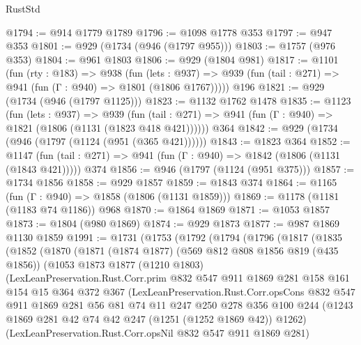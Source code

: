 \begin{lexlean}{RustStd}
\begin{coremodule}
@1794 := @914 @1779 @1789
@1796 := @1098 @1778 @353
@1797 := @947 @353
@1801 := @929 (@1734 (@946 (@1797 @955)))
@1803 := @1757 (@976 @353)
@1804 := @961 @1803
@1806 := @929 (@1804 @981)
@1817 := @1101
    (fun (rty : @183) =>
    @938
      (fun (lets : @937) =>
      @939 (fun (tail : @271) => @941 (fun (Γ : @940) => @1801 (@1806 @1767)))))
    @196
@1821 := @929 (@1734 (@946 (@1797 @1125)))
@1823 := @1132 @1762 @1478
@1835 := @1123
    (fun (lets : @937) =>
    @939 (fun (tail : @271) => @941 (fun (Γ : @940) => @1821 (@1806 (@1131 (@1823 @418 @421))))))
    @364
@1842 := @929 (@1734 (@946 (@1797 (@1124 (@951 (@365 @421))))))
@1843 := @1823 @364
@1852 := @1147
    (fun (tail : @271) => @941 (fun (Γ : @940) => @1842 (@1806 (@1131 (@1843 @421)))))
    @374
@1856 := @946 (@1797 (@1124 (@951 @375)))
@1857 := @1734 @1856
@1858 := @929 @1857
@1859 := @1843 @374
@1864 := @1165 (fun (Γ : @940) => @1858 (@1806 (@1131 @1859)))
@1869 := @1178 (@1181 (@1183 @74 @1186)) @968
@1870 := @1864 @1869
@1871 := @1053 @1857
@1873 := @1804 (@980 @1869)
@1874 := @929 @1873
@1877 := @987 @1869 @1130 @1859
@1991 := @1731
    (@1753
      (@1792
        (@1794
          (@1796
            (@1817
              (@1835
                (@1852
                  (@1870
                    (@1871
                      (@1874 @1877)
                      (@569 @812 @808 @1856 @819 (@435 @1856))
                      (@1053
                        @1873
                        @1877
                        (@1210 @1803)
                        (LexLeanPreservation.Rust.Corr.prim
                          @832
                          @547
                          @911
                          @1869
                          @281
                          @158
                          @161
                          @154
                          @15
                          @364
                          @372
                          @367
                          (LexLeanPreservation.Rust.Corr.opsCons
                            @832
                            @547
                            @911
                            @1869
                            @281
                            @56
                            @81
                            @74
                            @11
                            @247
                            @250
                            @278
                            @356
                            @100
                            @244
                            (@1243 @1869 @281 @42 @74 @42 @247 (@1251 (@1252 @1869 @42)) @1262)
                            (LexLeanPreservation.Rust.Corr.opsNil @832 @547 @911 @1869 @281)

\end{coremodule}
\end{lexlean}
